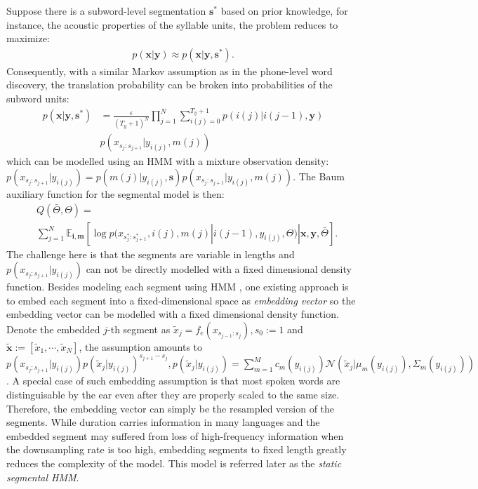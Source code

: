\documentclass[journal]{IEEEtran}
\begin{document}
Suppose there is a subword-level segmentation $\mathbf s^*$ based on prior knowledge, for instance, the acoustic properties of the syllable units, the problem reduces to maximize:
\begin{align}\label{eq:trans_prob_preseg_simplified}
   p(\mathbf x|\mathbf y) \approx p(\mathbf x|\mathbf y, \mathbf s^*). 
\end{align}
Consequently, with a similar Markov assumption as in the phone-level word discovery, the translation probability can be broken into probabilities of the subword units:
\begin{align*}
    p(\mathbf x|\mathbf y, \mathbf s^*) &= \frac{\epsilon}{(T_y+1)^N}\prod_{j=1}^{N} \sum_{i(j)=0}^{T_y+1}p(i(j)|i(j-1), \mathbf y)\nonumber\\ &p(x_{s_j:s_{j+1}}|y_{i(j)}, m(j))    
\end{align*}
which can be modelled using an HMM with a mixture observation density: $p(x_{s_j:s_{j+1}}|y_{i(j)}) = p(m(j)|y_{i(j)}, \mathbf s) p(x_{s_j:s_{j+1}}|y_{i(j)}, m(j))$. The Baum auxiliary function for the segmental model is then:
\begin{align}\label{eq:baum_subword_hmm}
    &Q(\bar{\Theta}, \Theta) = \nonumber\\
    & \sum_{j=1}^N \mathbb{E}_{\mathbf i, \mathbf m}[\log p(x_{s_j^*:s_{j+1}^*}, i(j), m(j)|i(j-1), y_{i(j)}, \Theta)|\mathbf x, \mathbf y, \bar{\Theta}].
\end{align}
The challenge here is that the segments are variable in lengths and $p(x_{s_j:s_{j+1}}|y_{i(j)})$ can not be directly modelled with a fixed dimensional density function. Besides modeling each segment using HMM \cite{Lee2012}, one existing approach \cite{Kamper2017} is to embed each segment into a fixed-dimensional space as \textit{embedding vector} so the embedding vector can be modelled with a fixed dimensional density function. Denote the embedded $j$-th segment as $\tilde{x}_j = f_e(x_{s_{j-1}:s_j}), s_0:=1$ and $\tilde{\mathbf x} := [\tilde{x}_1, \cdots, \tilde{x}_N]$, the assumption amounts to $p(x_{s_j:s_{j+1}}|y_{i(j)}) p(\tilde{x}_j|y_{i(j)})^{s_{j+1}-s_j}, p(\tilde{x}_j|y_{i(j)}) = \sum_{m=1}^M c_m(y_{i(j)})\mathcal N(\tilde{x}_j|\mu_m(y_{i(j)}), \Sigma_m(y_{i(j)}))$. A special case of such embedding assumption is that most spoken words are distinguisable by the ear even after they are properly scaled to the same size. Therefore, the embedding vector can simply be the resampled version of the segments. While duration carries information in many languages and the embedded segment may suffered from loss of high-frequency information when the downsampling rate is too high, embedding segments to fixed length greatly reduces the complexity of the model. This model is referred later as the \textit{static segmental HMM}.
\end{document}
